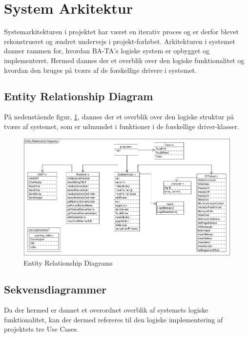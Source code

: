\graphicspath{{Chapters/SystemArkitektur/}}

\section{System Arkitektur}

Systemarkitekturen i projektet har været en iterativ proces og er derfor blevet rekonstrueret og ændret undervejs i projekt-forløbet.
Arkitekturen i systemet danner rammen for, hvordan BA-TA's logiske system er opbygget og implementeret. Hermed dannes der et overblik over den logiske funktionalitet og hvordan den bruges på tværs af de forskellige drivere i systemet.

\subsection{Entity Relationship Diagram}
På nedenstående figur, \ref{fig:Entity}, dannes der et overblik over den logiske struktur på tværs af systemet, som er udmundet i funktioner i de forskellige driver-klasser.

\begin{figure}[H]
	\centering
	\includegraphics[width = 500 pt]{Img/Entity.png}
	\caption{Entity Relationship Diagrams}
	\label{fig:Entity}
\end{figure}

\newpage

\subsection{Sekvensdiagrammer}
Da der hermed er dannet et overordnet overblik af systemets logiske funktionalitet, kan der dermed refereres til den logiske implementering af projektets tre Use Cases.

